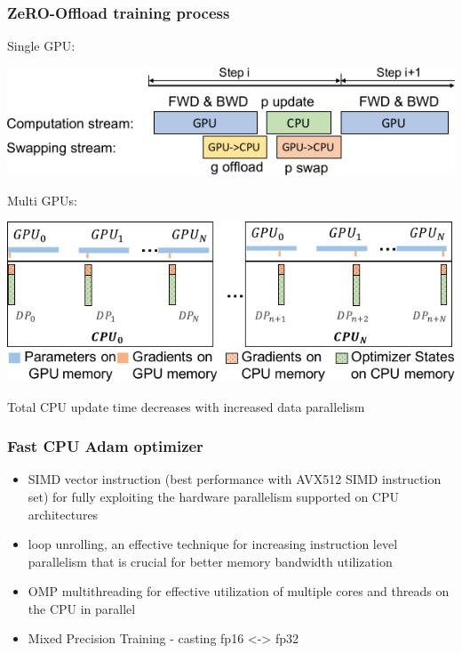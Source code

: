 \documentclass{beamer}
\begin{document}
\begin{frame}
    \frametitle{ZeRO-Offload training process}
    \footnotesize{Single GPU:}
    \begin{center}
        \includegraphics[scale=1.35]{img/zero_offload_single_gpu.png}
    \end{center}
    \footnotesize{Multi GPUs:}
    \begin{center}
        \includegraphics[scale=1.3]{img/zero_offload_multi_gpu.png}
    \end{center}
    \tiny{Total CPU update time decreases with increased data parallelism}
\end{frame}

\begin{frame}
    \frametitle{Fast CPU Adam optimizer}
    \begin{itemize}
        \item SIMD vector instruction (best performance with AVX512 SIMD instruction set) for fully exploiting the hardware parallelism supported on CPU architectures
        \item loop unrolling, an effective technique for increasing instruction level parallelism that is crucial for better memory bandwidth utilization
        \item OMP multithreading for effective utilization of multiple cores and threads on the CPU in parallel
        \item Mixed Precision Training - casting fp16 <-> fp32
    \end{itemize}
\end{frame}
\end{document}
